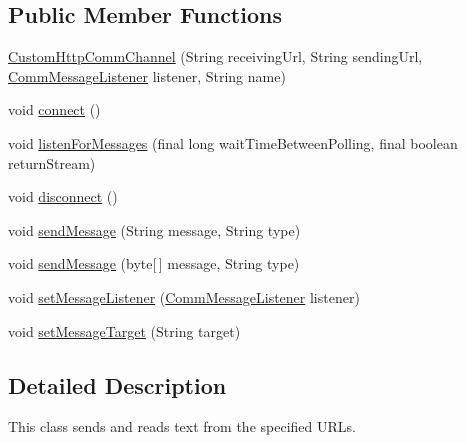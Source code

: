\subsection*{Public Member Functions}
\begin{DoxyCompactItemize}
\item 
\hyperlink{classcom_1_1cellbots_1_1communication_1_1_custom_http_comm_channel_a6892cab26bf15870db5d71dcc6baa6b9}{Custom\-Http\-Comm\-Channel} (String receiving\-Url, String sending\-Url, \hyperlink{interfacecom_1_1cellbots_1_1communication_1_1_abstract_comm_channel_1_1_comm_message_listener}{Comm\-Message\-Listener} listener, String name)
\item 
void \hyperlink{classcom_1_1cellbots_1_1communication_1_1_custom_http_comm_channel_af750d98dba4c0d27b0189d4a8c2eb5f3}{connect} ()
\item 
void \hyperlink{classcom_1_1cellbots_1_1communication_1_1_custom_http_comm_channel_a303b10de38ff2b006b987bdd9dddfba0}{listen\-For\-Messages} (final long wait\-Time\-Between\-Polling, final boolean return\-Stream)
\item 
void \hyperlink{classcom_1_1cellbots_1_1communication_1_1_custom_http_comm_channel_abee2fc163cd1ecde599d354bb56b4c3f}{disconnect} ()
\item 
void \hyperlink{classcom_1_1cellbots_1_1communication_1_1_custom_http_comm_channel_a1aa142239d5be3b4fd0cd77bac663cf2}{send\-Message} (String message, String type)
\item 
void \hyperlink{classcom_1_1cellbots_1_1communication_1_1_custom_http_comm_channel_a4031631625bfb2c517b4600b92da9ac9}{send\-Message} (byte\mbox{[}$\,$\mbox{]} message, String type)
\item 
void \hyperlink{classcom_1_1cellbots_1_1communication_1_1_custom_http_comm_channel_a76e158289ba2ee2d7f3a26f9dcc11d84}{set\-Message\-Listener} (\hyperlink{interfacecom_1_1cellbots_1_1communication_1_1_abstract_comm_channel_1_1_comm_message_listener}{Comm\-Message\-Listener} listener)
\item 
void \hyperlink{classcom_1_1cellbots_1_1communication_1_1_custom_http_comm_channel_a2704b7b08c308d2a1f087eb1b66ff341}{set\-Message\-Target} (String target)
\end{DoxyCompactItemize}


\subsection{Detailed Description}
This class sends and reads text from the specified U\-R\-Ls.

